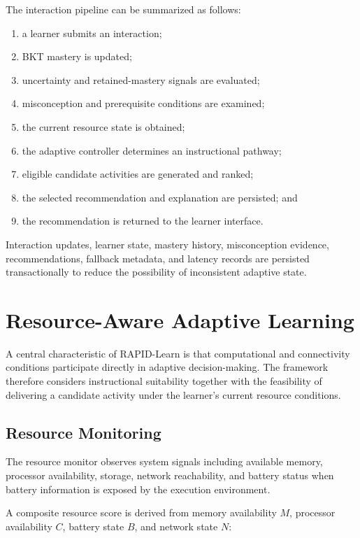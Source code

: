 \documentclass[conference]{IEEEtran}
\begin{document}
The interaction pipeline can be summarized as follows:

\begin{enumerate}
    \item a learner submits an interaction;
    \item BKT mastery is updated;
    \item uncertainty and retained-mastery signals are evaluated;
    \item misconception and prerequisite conditions are examined;
    \item the current resource state is obtained;
    \item the adaptive controller determines an instructional pathway;
    \item eligible candidate activities are generated and ranked;
    \item the selected recommendation and explanation are persisted; and
    \item the recommendation is returned to the learner interface.
\end{enumerate}

Interaction updates, learner state, mastery history, misconception evidence, recommendations, fallback metadata, and latency records are persisted transactionally to reduce the possibility of inconsistent adaptive state.

\section{Resource-Aware Adaptive Learning}

A central characteristic of RAPID-Learn is that computational and connectivity conditions participate directly in adaptive decision-making. The framework therefore considers instructional suitability together with the feasibility of delivering a candidate activity under the learner's current resource conditions.

\subsection{Resource Monitoring}

The resource monitor observes system signals including available memory, processor availability, storage, network reachability, and battery status when battery information is exposed by the execution environment.

A composite resource score is derived from memory availability $M$, processor availability $C$, battery state $B$, and network state $N$:
\end{document}
